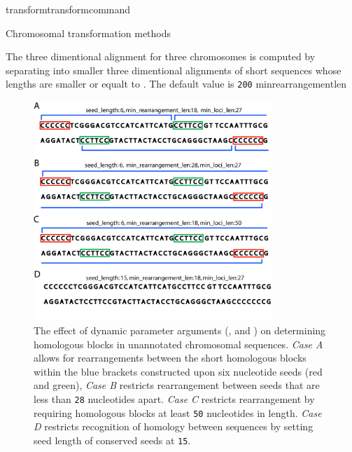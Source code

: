 \begin{command}{transform}{transformcommand}
\begin{arguments}
\begin{argumentgroup}{Chromosomal transformation methods}
\begin{description}
                            {The three dimentional alignment for three chromosomes
                            is computed by separating into smaller three dimentional
                            alignments of short sequences whose lengths are smaller 
                            or equalt to . The default value
                             is \texttt{200}}
                             {minrearrangementlen}


 			\begin{figure} [!htbp]
   		 	\begin{center}
        			\includegraphics[width=0.8\textwidth]{doc/figures/chromfig1.jpg}
    			\end{center}
    			\caption{The effect of dynamic parameter arguments (, 
			and ) on determining homologous blocks in unannotated chromosomal sequences.
			 \emph{Case A} allows for rearrangements between the short homologous blocks within the 				     
			blue brackets constructed upon six nucleotide seeds (red and green), \emph{Case B} 
			restricts rearrangement between seeds that are less than \texttt{28} nucleotides apart.
			 \emph{Case C} restricts rearrangement by requiring homologous blocks at least \texttt{50} nucleotides
			  in length. \emph{Case D} restricts recognition of homology between sequences by setting seed length
			   of conserved seeds at \texttt{15}.}
    		\label{fig:chrom}
		\end{figure}


\end{description}
\end{argumentgroup}
\end{arguments}
\end{command}
